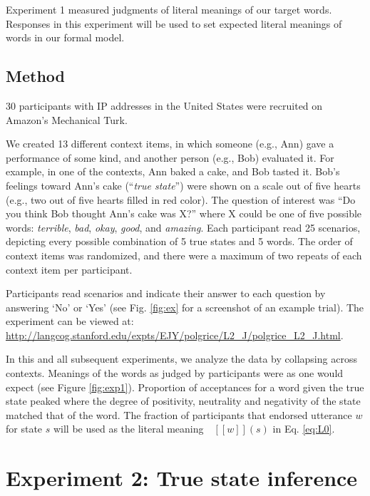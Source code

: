 \documentclass[10pt,letterpaper]{article}
\newcommand{\denote}[1]{\mbox{ $[\![ #1 ]\!]$}}
\begin{document}
Experiment 1 measured judgments of literal meanings of our target words.
Responses in this experiment will be used to set expected literal meanings of words in our formal model.

\subsection{Method}

30 participants with IP addresses in the United States were recruited on Amazon's Mechanical Turk.

We created 13 different context items, in which someone (e.g., Ann) gave a performance of some kind, and another person (e.g., Bob) evaluated it. For example, in one of the contexts, Ann baked a cake, and Bob tasted it. Bob's feelings toward Ann's cake (``\emph{true state}'') were shown on a scale out of five hearts (e.g., two out of five hearts filled in red color). The question of interest was ``Do you think Bob thought Ann's cake was X?'' where X could be one of five possible words: \emph{terrible}, \emph{bad}, \emph{okay}, \emph{good}, and \emph{amazing}. Each participant read 25 scenarios, depicting every possible combination of 5 true states and 5 words. 
The order of context items was randomized, and there were a maximum of two repeats of each context item per participant.

Participants read scenarios and indicate their answer to each question by answering `No' or `Yes' (see Fig. \ref{fig:ex} for a screenshot of an example trial).
The experiment can be viewed at: \url{http://langcog.stanford.edu/expts/EJY/polgrice/L2_J/polgrice_L2_J.html}.

In this and all subsequent experiments, we analyze the data by collapsing across contexts.
Meanings of the words as judged by participants were as one would expect (see Figure \ref{fig:exp1}).
Proportion of acceptances for a word given the true state peaked where the degree of positivity, neutrality and negativity of the state matched that of the word.
The fraction of participants that endorsed utterance $w$ for state $s$ will be used as the literal meaning $\denote{w}(s)$ in Eq. \ref{eq:L0}.


\section{Experiment 2: True state inference}
\end{document}
